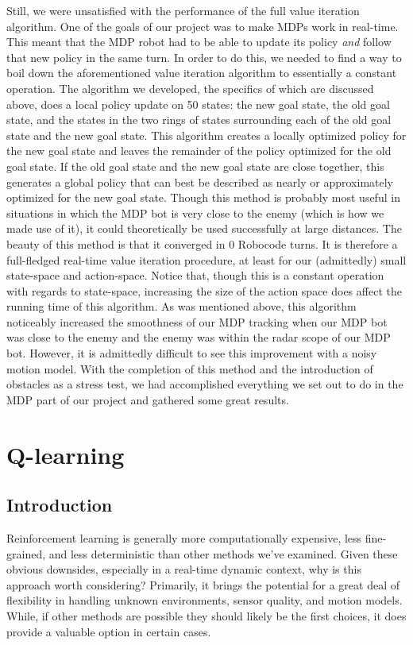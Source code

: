 \documentclass{aiaa-tc}%
\begin{document}
Still, we were unsatisfied with the performance of the full value iteration algorithm. One of the goals of our project was to make MDPs work in real-time. This meant that the MDP robot had to be able to update its policy \emph{and} follow that new policy in the same turn. In order to do this, we needed to find a way to boil down the aforementioned  value iteration algorithm to essentially a constant operation. The algorithm we developed, the specifics of which are discussed above, does a local policy update on 50 states: the new goal state, the old goal state, and the states in the two rings of states surrounding each of the old goal state and the new goal state. This algorithm creates a locally optimized policy for the new goal state and leaves the remainder of the policy optimized for the old goal state. If the old goal state and the new goal state are close together, this generates a global policy that can best be described as nearly or approximately optimized for the new goal state. Though this method is probably most useful in situations in which the MDP bot is very close to the enemy (which is how we made use of it), it could theoretically be used successfully at large distances. The beauty of this method is that it converged in 0 Robocode turns. It is therefore a full-fledged real-time value iteration procedure, at least for our (admittedly) small state-space and action-space. Notice that, though this is a constant operation with regards to state-space, increasing the size of the action space does affect the running time of this algorithm. As was mentioned above, this algorithm noticeably increased the smoothness of our MDP tracking when our MDP bot was close to the enemy and the enemy was within the radar scope of our MDP bot. However, it is admittedly difficult to see this improvement with a noisy motion model. With the completion of this method and the introduction of obstacles as a stress test, we had accomplished everything we set out to do in the MDP part of our project and gathered some great results.
\section{Q-learning}
\label{Q-learning}
\subsection{Introduction}
Reinforcement learning is generally more computationally expensive,
less fine-grained, and less deterministic than other methods we've
examined. Given these obvious downsides, especially in a
real-time dynamic context, why is this approach worth
considering? Primarily, it brings the potential for a great deal of
flexibility in handling unknown environments, sensor quality, and
motion models. While, if other methods are possible they should likely
be the first choices, it does provide a valuable option in certain
cases. 
\end{document}
